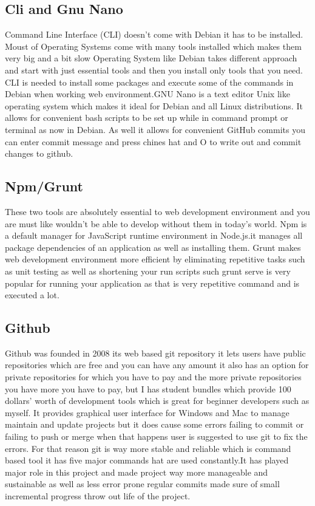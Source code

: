 \subsection{Cli and Gnu Nano}

Command Line Interface (CLI) doesn’t come with Debian it has to be installed. Moust of Operating Systems come with many tools installed which makes them very big and a bit slow Operating System like Debian takes different approach and start with just essential tools and then you install only tools that you need. CLI is needed to install some packages and execute some of the commands in Debian when working web environment.GNU Nano is a text editor Unix like operating system which makes it ideal for Debian and all Linux distributions. It allows for convenient bash scripts to be set up while in command prompt or terminal as now in Debian. As well it allows for convenient GitHub commits you can enter commit message and press chines hat and O to write out and commit changes to github.


\subsection{Npm/Grunt}These two tools are absolutely essential to web development environment and you are must like wouldn’t be able to develop without them in today’s world. Npm is a default manager for JavaScript runtime environment in Node.js.it manages all package dependencies of an application as well as installing them. Grunt makes web development environment more efficient by eliminating repetitive tasks such as unit testing as well as shortening your run scripts such grunt serve is very popular for running your application as that is very repetitive command and is executed a lot.

\subsection{Github}
Github was founded in 2008 its web based git repository it lets users have public repositories which are free and you can have any amount it also has an option for private repositories for which you have to pay and the more private repositories you have more you have to pay, but I has student bundles which provide 100 dollars’ worth of development tools which is great for beginner developers such as myself. It provides graphical user interface for Windows and Mac to manage maintain and update projects but it does cause some errors failing to commit or failing to push or merge when that happens user is suggested to use git to fix the errors. For that reason git is way more stable and reliable which is command based tool it has five major commands hat are used constantly.It has played major role in this project and made project way more manageable and sustainable as well as less error prone regular commits made sure of small incremental progress throw out life of the project.

